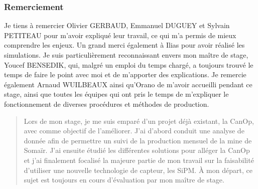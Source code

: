 

\begin{center}

    \subsubsection*{Remerciement}
\end{center}
Je tiens à remercier Olivier GERBAUD, Emmanuel DUGUEY et Sylvain PETITEAU pour m'avoir expliqué leur travail, ce qui m'a permis de mieux comprendre les enjeux. Un grand merci également à Ilias pour avoir réalisé les simulations. Je suis particulièrement reconnaissant envers mon maître de stage, Youcef BENSEDIK, qui, malgré un emploi du temps chargé, a toujours trouvé le temps de faire le point avec moi et de m'apporter des explications. Je remercie également Arnaud WUILBEAUX ainsi qu'Orano de m'avoir accueilli pendant ce stage, ainsi que toutes les équipes qui ont pris le temps de m'expliquer le fonctionnement de diverses procédures et méthodes de production.



\begin{abstract}
    Lors de mon stage, je me suis emparé d'un projet déjà existant, la CanOp, avec comme objectif de l'améliorer. J'ai d'abord conduit une analyse de donnée afin de permettre un suivi de la production mensuel de la mine de Somaïr. J'ai ensuite étudié les différentes solutions pour alléger la CanOp et j'ai finalement focalisé la majeure partie de mon travail sur la faisabilité d'utiliser une nouvelle technologie de capteur, les SiPM. À mon départ, ce sujet est toujours en cours d'évaluation par mon maître de stage.
\end{abstract}


\begin{adjustwidth}{30pt}{30pt}
\end{adjustwidth}

\tableofcontents
\listoffigures
\clearpage